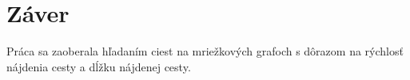 \chapter*{Záver}

Práca sa zaoberala hľadaním ciest na mriežkových grafoch s dôrazom na rýchlosť nájdenia cesty a dĺžku nájdenej cesty. 

